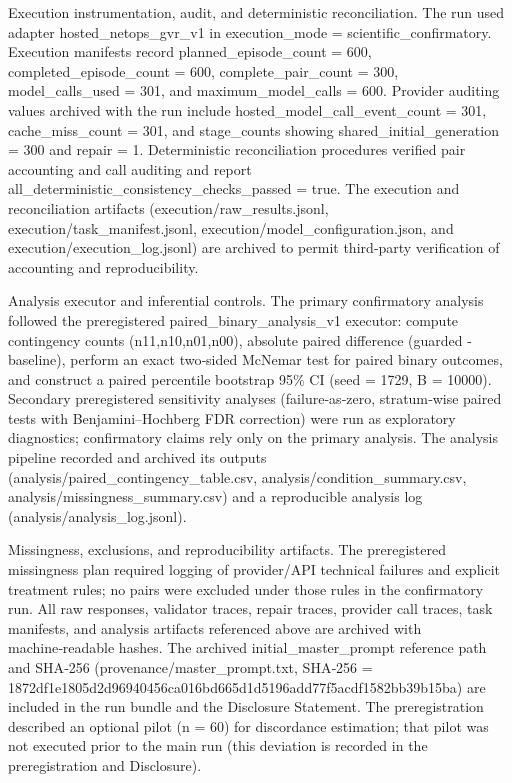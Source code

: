 \documentclass[conference]{IEEEtran}
\begin{document}
Execution instrumentation, audit, and deterministic reconciliation. The run used adapter hosted\_netops\_gvr\_v1 in execution\_mode = scientific\_confirmatory. Execution manifests record planned\_episode\_count = 600, completed\_episode\_count = 600, complete\_pair\_count = 300, model\_calls\_used = 301, and maximum\_model\_calls = 600. Provider auditing values archived with the run include hosted\_model\_call\_event\_count = 301, cache\_miss\_count = 301, and stage\_counts showing shared\_initial\_generation = 300 and repair = 1. Deterministic reconciliation procedures verified pair accounting and call auditing and report all\_deterministic\_consistency\_checks\_passed = true. The execution and reconciliation artifacts (execution/raw\_results.jsonl, execution/task\_manifest.jsonl, execution/model\_configuration.json, and execution/execution\_log.jsonl) are archived to permit third‑party verification of accounting and reproducibility.

Analysis executor and inferential controls. The primary confirmatory analysis followed the preregistered paired\_binary\_analysis\_v1 executor: compute contingency counts (n11,n10,n01,n00), absolute paired difference (guarded - baseline), perform an exact two‑sided McNemar test for paired binary outcomes, and construct a paired percentile bootstrap 95\% CI (seed = 1729, B = 10000). Secondary preregistered sensitivity analyses (failure‑as‑zero, stratum‑wise paired tests with Benjamini--Hochberg FDR correction) were run as exploratory diagnostics; confirmatory claims rely only on the primary analysis. The analysis pipeline recorded and archived its outputs (analysis/paired\_contingency\_table.csv, analysis/condition\_summary.csv, analysis/missingness\_summary.csv) and a reproducible analysis log (analysis/analysis\_log.jsonl).

Missingness, exclusions, and reproducibility artifacts. The preregistered missingness plan required logging of provider/API technical failures and explicit treatment rules; no pairs were excluded under those rules in the confirmatory run. All raw responses, validator traces, repair traces, provider call traces, task manifests, and analysis artifacts referenced above are archived with machine‑readable hashes. The archived initial\_master\_prompt reference path and SHA‑256 (provenance/master\_prompt.txt, SHA‑256 = 1872df1e\allowbreak{}1805d2d9\allowbreak{}6940456c\allowbreak{}a016bd66\allowbreak{}5d1d5196\allowbreak{}add77f5a\allowbreak{}cdf1582b\allowbreak{}b39b15ba) are included in the run bundle and the Disclosure Statement. The preregistration described an optional pilot (n = 60) for discordance estimation; that pilot was not executed prior to the main run (this deviation is recorded in the preregistration and Disclosure).
\end{document}
